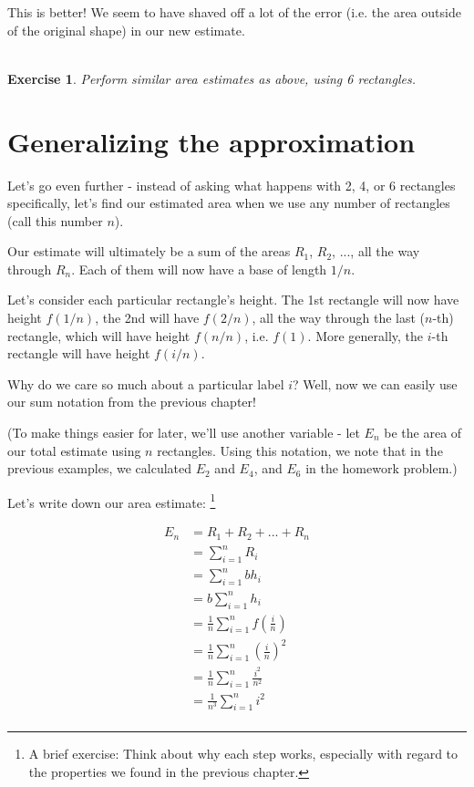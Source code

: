 \documentclass{article}
\newtheorem{exercise}{\\ \bf Exercise}
\begin{document}

This is better! We seem to have shaved off a lot of the error (i.e. the area outside of the original shape) in our new estimate. 

\begin{exercise}
Perform similar area estimates as above, using 6 rectangles.
\end{exercise}


\section{Generalizing the approximation}

Let's go even further - instead of asking what happens with 2, 4, or 6 rectangles specifically, let's find our estimated area when we use any number of rectangles (call this number $n$). 

Our estimate will ultimately be a sum of the areas $R_1$, $R_2$, ..., all the way through $R_n$. Each of them will now have a base of length $1/n$. 

Let's consider each particular rectangle's height. The 1st rectangle will now have height $f(1/n)$, the 2nd will have $f(2/n)$, all the way through the last ($n$-th) rectangle, which will have height $f(n/n)$, i.e. $f(1)$. More generally, the $i$-th rectangle will have height $f(i/n)$. 



Why do we care so much about a particular label $i$? Well, now we can easily use our sum notation from the previous chapter! 

(To make things easier for later, we'll use another variable - let $E_n$ be the area of our total estimate using $n$ rectangles. Using this notation, we note that in the previous examples, we calculated $E_2$ and $E_4$, and $E_6$ in the homework problem.)

Let's write down our area estimate: \footnote{A brief exercise: Think about why each step works, especially with regard to the properties we found in the previous chapter.}


\begin{align*}
E_n &= R_1 + R_2 + ... + R_n \\
&= \sum_{i=1}^n R_i \\
&= \sum_{i=1}^n b h_i \\
&= b \sum_{i=1}^n h_i \\
&= \frac{1}{n} \sum_{i=1}^n f(\frac{i}{n}) \\
&= \frac{1}{n} \sum_{i=1}^n \left(\frac{i}{n}\right)^2 \\
&= \frac{1}{n} \sum_{i=1}^n \frac{i^2}{n^2} \\
&= \frac{1}{n^3} \sum_{i=1}^n i^2 \\
\end{align*}
\end{document}
